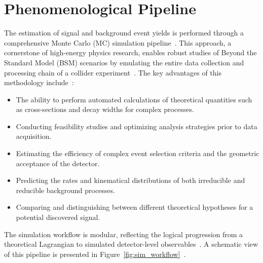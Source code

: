 \section{Phenomenological Pipeline}

The estimation of signal and background event yields is performed through a comprehensive Monte Carlo (MC) simulation pipeline~\cite{Christensen:2008py,Alloul:2013bka,Degrande:2011ua,Alwall:2014hca}. This approach, a cornerstone of high-energy physics research, enables robust studies of Beyond the Standard Model (BSM) scenarios by emulating the entire data collection and processing chain of a collider experiment~\cite{Sjostrand:2014zea,deFavereau:2013fsa}. The key advantages of this methodology include~\cite{Alwall:2014hca,Cacciari:2011ma}:

\begin{itemize}
    \item The ability to perform automated calculations of theoretical quantities such as cross-sections and decay widths for complex processes.
    \item Conducting feasibility studies and optimizing analysis strategies prior to data acquisition.
    \item Estimating the efficiency of complex event selection criteria and the geometric acceptance of the detector.
    \item Predicting the rates and kinematical distributions of both irreducible and reducible background processes.
    \item Comparing and distinguishing between different theoretical hypotheses for a potential discovered signal.
\end{itemize}

The simulation workflow is modular, reflecting the logical progression from a theoretical Lagrangian to simulated detector-level observables~\cite{Christensen:2008py,Alloul:2013bka,Degrande:2011ua,Alwall:2014hca}. A schematic view of this pipeline is presented in Figure~\ref{fig:sim_workflow}~\cite{Alwall:2014hca,deFavereau:2013fsa}.

